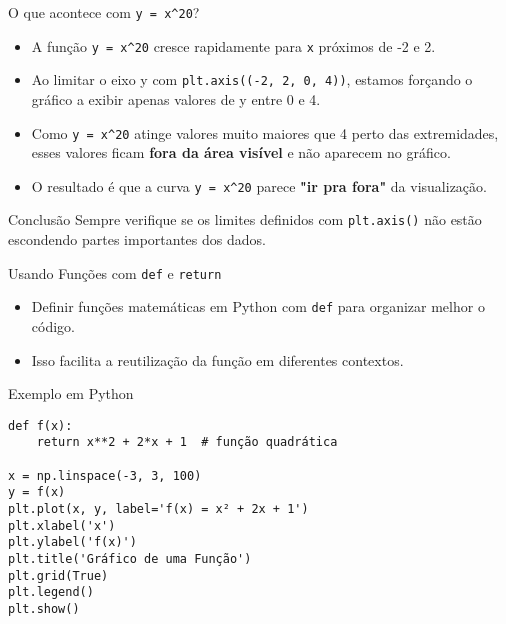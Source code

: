 \begin{frame}{O que acontece com \texttt{y = x\^{}20}?}
    \begin{itemize}
        \item A função \texttt{y = x\^{}20}  cresce rapidamente para \texttt{x} próximos de -2 e 2.
        \item Ao limitar o eixo y com \texttt{plt.axis((-2, 2, 0, 4))}, estamos forçando o gráfico a exibir apenas valores de y entre 0 e 4.
        \item Como \texttt{y = x\^{}20} atinge valores muito maiores que 4 perto das extremidades,
              esses valores ficam \textbf{fora da área visível} e não aparecem no gráfico.
        \item O resultado é que a curva \texttt{y = x\^{}20} parece \textbf{"ir pra fora"} da visualização.
    \end{itemize}


    \begin{alertblock}{Conclusão}
        Sempre verifique se os limites definidos com \texttt{plt.axis()} não estão escondendo partes importantes dos dados.
    \end{alertblock}
\end{frame}


\begin{frame}[fragile]{Usando Funções com \texttt{def} e \texttt{return}}
    \begin{itemize}
        \item Definir funções matemáticas em Python com \texttt{def} para organizar melhor o código.
        \item Isso facilita a reutilização da função em diferentes contextos.
    \end{itemize}

    \begin{block}{Exemplo em Python}
\begin{verbatim}
def f(x):
    return x**2 + 2*x + 1  # função quadrática

x = np.linspace(-3, 3, 100)
y = f(x)
plt.plot(x, y, label='f(x) = x² + 2x + 1')
plt.xlabel('x')
plt.ylabel('f(x)')
plt.title('Gráfico de uma Função')
plt.grid(True)
plt.legend()
plt.show()
\end{verbatim}
    \end{block}
    
\end{frame}

